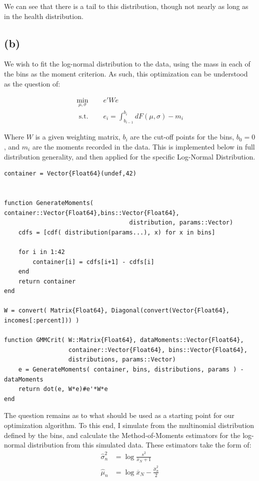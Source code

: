 \documentclass[12pt]{paper}
\newcommand{\mean}[2][N]{ \overline{ #2 }_{#1}}
\newcommand{\est}[2][n]{ \widehat{ #2 }_{#1}}
\begin{document}
We can see that there is a tail to this distribution, though not
nearly as long as in the health distribution.

\subsection{(b)}

We wish to fit the log-normal distribution to the data, using the mass
in each of the bins as the moment criterion. As such, this
optimization can be understood as the question of:

\begin{align*}
  \min_{\mu,\sigma} \quad &e' W e\\
  \text{ s.t. } \quad & e_i = \int_{b_{i-1}}^{b_i} dF(\mu,\sigma) - m_i
\end{align*}

Where $W$ is a given weighting matrix, $b_i$ are the cut-off points
for the bins, $b_0 = 0$, and $m_i$ are the moments recorded in the
data. This is implemented below in full distribution generality, and
then applied for the specific Log-Normal Distribution.

\begin{verbatim}
container = Vector{Float64}(undef,42)


function GenerateMoments( container::Vector{Float64},bins::Vector{Float64},
                                   distribution, params::Vector)
    cdfs = [cdf( distribution(params...), x) for x in bins]

    for i in 1:42
        container[i] = cdfs[i+1] - cdfs[i]
    end
    return container
end

W = convert( Matrix{Float64}, Diagonal(convert(Vector{Float64}, incomes[:percent])) )

function GMMCrit( W::Matrix{Float64}, dataMoments::Vector{Float64},
                  container::Vector{Float64}, bins::Vector{Float64},
                  distributions, params::Vector)
    e = GenerateMoments( container, bins, distributions, params ) - dataMoments
    return dot(e, W*e)#e'*W*e
end
\end{verbatim}

The question remains as to what should be used as a starting point for
our optimization algorithm. To this end, I simulate from the
multinomial distribution defined by the bins, and calculate the
Method-of-Moments estimators for the log-normal distribution from this
simulated data. These estimators take the form of:
\begin{align*}
  \est{\sigma}^2 &= \log \frac{s^2}{\mean{x} + 1}\\
  \est{\mu} &= \log \mean{x} - \frac{\est{\sigma}^2}{2}
\end{align*}
\end{document}
